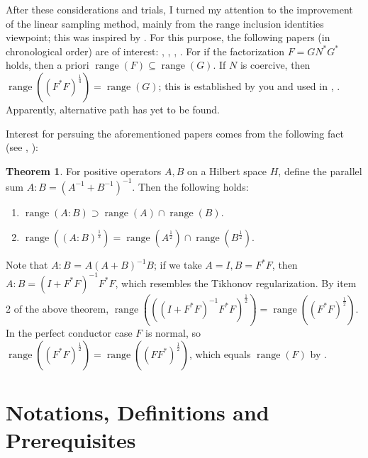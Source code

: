 \documentclass[a4paper,12pt]{article}
\theoremstyle{definition}
\newtheorem{thm}{Theorem}
\DeclareMathOperator\range{range}
\begin{document}
After these considerations and trials, I turned my attention to the improvement of the linear sampling method, mainly from the range inclusion identities viewpoint; this was inspired by \citet{hanke08}. For this purpose, the following papers (in chronological order) are of interest: \citet{douglas}, \citet{fillmore}, \citet{anderson75}, \citet{barnes}. For if the factorization $F=GN^*G^*$ holds, then a priori $\range(F)\subseteq\range(G)$. If $N$ is coercive, then $\range((F^*F)^\frac{1}{4})=\range(G)$; this is established by you and used in \citet{arens04}, \citet{arens09}. Apparently, alternative path has yet to be found.

Interest for persuing the aforementioned papers comes from the following fact (see \citet[Theorem 4.2]{fillmore}, \citet[Theorem 11]{anderson75}):
\begin{thm}
  For positive operators $A, B$ on a Hilbert space $H$, define the parallel sum $A:B=(A^{-1} + B^{-1})^{-1}$. Then the following holds:
  \begin{enumerate}
    \item $\range(A:B) \supset \range(A)\cap\range(B)$.
    \item $\range((A:B)^\frac{1}{2}) = \range(A^\frac{1}{2}) \cap \range(B^\frac{1}{2})$.
  \end{enumerate}
\end{thm}

Note that $A:B$ = $A(A+B)^{-1}B$; if we take $A=I, B=F^*F$, then $A:B = (I + F^*F)^{-1}F^*F$, which resembles the Tikhonov regularization. By item 2 of the above theorem, $\range(((I + F^*F)^{-1}F^*F)^\frac{1}{2}) = \range((F^*F)^\frac{1}{2})$. In the perfect conductor case $F$ is normal, so $\range((F^*F)^\frac{1}{2}) = \range((FF^*)^\frac{1}{2})$, which equals $\range(F)$ by \citet[Theorem 1]{douglas}.

\section{Notations, Definitions and Prerequisites} 
\end{document}
